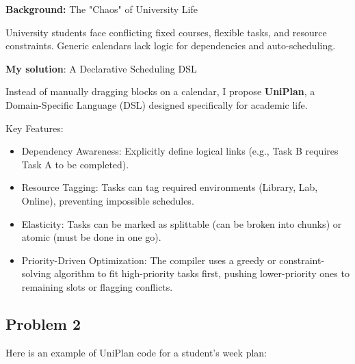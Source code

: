 \textbf{Background:} The "Chaos" of University Life

University students face conflicting fixed courses, flexible tasks, and resource constraints. Generic calendars lack logic for dependencies and auto-scheduling.

\textbf{My solution}: A Declarative Scheduling DSL

Instead of manually dragging blocks on a calendar, I propose \textbf{UniPlan}, a Domain-Specific Language (DSL) designed specifically for academic life.

Key Features:
\begin{itemize}
    \item Dependency Awareness: Explicitly define logical links (e.g., Task B requires Task A to be completed).
    \item Resource Tagging: Tasks can tag required environments (Library, Lab, Online), preventing impossible schedules.
    \item Elasticity: Tasks can be marked as splittable (can be broken into chunks) or atomic (must be done in one go).
    \item Priority-Driven Optimization: The compiler uses a greedy or constraint-solving algorithm to fit high-priority tasks first, pushing lower-priority ones to remaining slots or flagging conflicts.
\end{itemize}


\subsection{Problem 2}

Here is an example of UniPlan code for a student’s week plan:


